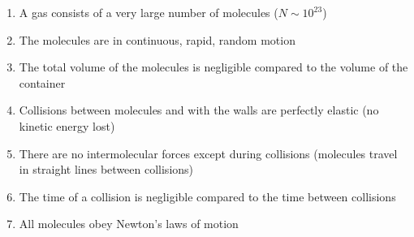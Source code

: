 \begin{defbox}
\begin{enumerate}[noitemsep]
  \item A gas consists of a very large number of
  molecules ($N \sim 10^{23}$)
  \item The molecules are in continuous, rapid,
  random motion
  \item The total volume of the molecules is
  negligible compared to the volume of the container
  \item Collisions between molecules and with the
  walls are perfectly elastic (no kinetic energy lost)
  \item There are no intermolecular forces except
  during collisions (molecules travel in straight
  lines between collisions)
  \item The time of a collision is negligible
  compared to the time between collisions
  \item All molecules obey Newton's laws of motion
\end{enumerate}
\end{defbox}

